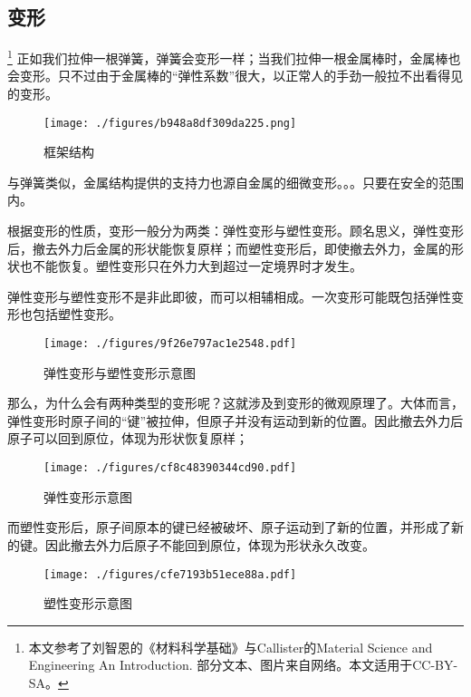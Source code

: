 
\subsection{变形}
\footnote{本文参考了刘智恩的《材料科学基础》与Callister的Material Science and Engineering An Introduction. 部分文本、图片来自网络。本文适用于CC-BY-SA。}
正如我们拉伸一根弹簧，弹簧会变形一样；当我们拉伸一根金属棒时，金属棒也会变形。只不过由于金属棒的“弹性系数”很大，以正常人的手劲一般拉不出看得见的变形。

\begin{example}{}
\begin{figure}[ht]
\centering
\texttt{[image: ./figures/b948a8df309da225.png]}
\caption{框架结构} \label{fig_MetDfm_1}
\end{figure}
与弹簧类似，金属结构提供的支持力也源自金属的细微变形。。。只要在安全的范围内。
\end{example}

根据变形的性质，变形一般分为两类：弹性变形与塑性变形。顾名思义，弹性变形后，撤去外力后金属的形状能恢复原样；而塑性变形后，即使撤去外力，金属的形状也不能恢复。塑性变形只在外力大到超过一定境界时才发生。

弹性变形与塑性变形不是非此即彼，而可以相辅相成。一次变形可能既包括弹性变形也包括塑性变形。

\begin{figure}[ht]
\centering
\texttt{[image: ./figures/9f26e797ac1e2548.pdf]}
\caption{弹性变形与塑性变形示意图} \label{fig_MetDfm_2}
\end{figure}

那么，为什么会有两种类型的变形呢？这就涉及到变形的微观原理了。大体而言，弹性变形时原子间的“键”被拉伸，但原子并没有运动到新的位置。因此撤去外力后原子可以回到原位，体现为形状恢复原样；
\begin{figure}[ht]
\centering
\texttt{[image: ./figures/cf8c48390344cd90.pdf]}
\caption{弹性变形示意图} \label{fig_MetDfm_11}
\end{figure}
而塑性变形后，原子间原本的键已经被破坏、原子运动到了新的位置，并形成了新的键。因此撤去外力后原子不能回到原位，体现为形状永久改变。
\begin{figure}[ht]
\centering
\texttt{[image: ./figures/cfe7193b51ece88a.pdf]}
\caption{塑性变形示意图} \label{fig_MetDfm_12}
\end{figure}

